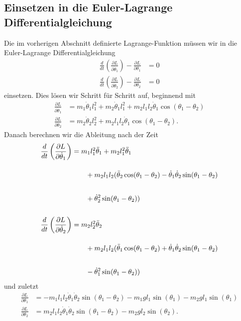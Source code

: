 \subsection{Einsetzen in die Euler-Lagrange Differentialgleichung}
Die im vorherigen Abschnitt definierte Lagrange-Funktion müssen wir in
die Euler-Lagrange Differentialgleichung
\begin{align}
    \label{eq:lag}
    \frac{d}{dt} \left(\frac{\partial L}{\partial \dot{\theta}_1}\right) 
    - \frac{\partial L}{\partial \theta_1} &= 0\\
    \frac{d}{dt} \left(\frac{\partial L}{\partial \dot{\theta}_2}\right) 
    - \frac{\partial L}{\partial \theta_2} &= 0
\end{align}
einsetzen.
Dies lösen wir Schritt für Schritt auf, beginnend mit
\begin{align*}
    \frac{\partial L}{\partial \dot{\theta}_1} &= m_1 \dot{\theta}_1 l_1^2
    + m_2 \dot{\theta}_1 l_1^2 + m_2 l_1 l_2 \dot{\theta}_1
    \cos(\theta_1-\theta_2)\\
    \frac{\partial L}{\partial \dot{\theta}_2} &= m_2 \dot{\theta}_2 l_2^2
    + m_2 l_1 l_2 \dot{\theta}_1 \cos(\theta_1-\theta_2).
\end{align*}
Danach berechnen wir die Ableitung nach der Zeit
\begin{align*}
    \frac{d}{dt} \left(\frac{\partial L}{\partial \dot{\theta}_1}\right) &=
    m_1 l_1^2 \ddot{\theta}_1 + m_2 l_1^2 \ddot{\theta}_1\\
    \shortintertext{}
    & \qquad + m_2 l_1 l_2 (\ddot{\theta}_2\cos(\theta_1-\theta_2)-
    \dot{\theta}_1 \dot{\theta}_2 \sin(\theta_1-\theta_2) \nonumber\\
    \shortintertext{}
    & \qquad + \dot{\theta}_2^2 \sin(\theta_1-\theta_2))
    \nonumber\\
    \shortintertext{}
    \frac{d}{dt} \left(\frac{\partial L}{\partial \dot{\theta}_2}\right) &=
    m_2 l_2^2 \ddot{\theta}_2\\
    \shortintertext{}
    & \qquad + m_2 l_1 l_2 (\ddot{\theta}_1\cos(\theta_1-\theta_2)+
    \dot{\theta}_1 \dot{\theta}_2 \sin(\theta_1-\theta_2) \nonumber\\
    \shortintertext{}
    & \qquad - \dot{\theta}_1^2 \sin(\theta_1-\theta_2))
    \nonumber
\end{align*}
und zuletzt
\begin{align*}
    \frac{\partial L}{\partial {\theta}_1} &= -m_1 l_1 l_2 \dot{\theta}_1
    \dot{\theta}_2 \sin(\theta_1-\theta_2) - m_1 g l_1 \sin(\theta_1)
    - m_2 g l_1 \sin(\theta_1)\\
    \frac{\partial L}{\partial {\theta}_2} &= m_2 l_1 l_2 \dot{\theta}_1
    \dot{\theta}_2 \sin(\theta_1-\theta_2) - m_2 g l_2 \sin(\theta_2).
\end{align*}
